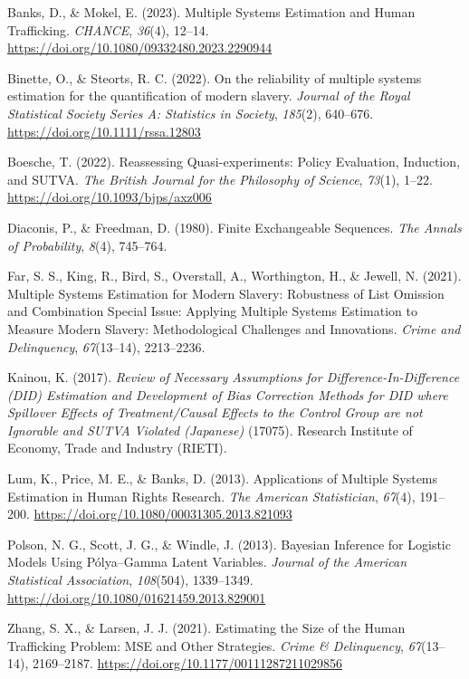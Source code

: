 \documentclass[
  12pt,
]{article}
\newlength{\cslhangindent}
\newenvironment{CSLReferences}[2] %
 {\begin{list}{}{%
  \setlength{\itemindent}{0pt}
  \setlength{\leftmargin}{0pt}
  \setlength{\parsep}{0pt}
  \ifodd #1
   \setlength{\leftmargin}{\cslhangindent}
   \setlength{\itemindent}{-1\cslhangindent}
  \fi
  \setlength{\itemsep}{#2\baselineskip}}}
 {\end{list}}
\theoremstyle{plain}
\theoremstyle{definition}
\begin{document}
\label{refs}
\begin{CSLReferences}{1}{0}
Banks, D., \& Mokel, E. (2023). Multiple {Systems Estimation} and {Human
Trafficking}. \emph{CHANCE}, \emph{36}(4), 12--14.
\url{https://doi.org/10.1080/09332480.2023.2290944}

Binette, O., \& Steorts, R. C. (2022). On the reliability of multiple
systems estimation for the quantification of modern slavery.
\emph{Journal of the Royal Statistical Society Series A: Statistics in
Society}, \emph{185}(2), 640--676.
\url{https://doi.org/10.1111/rssa.12803}

Boesche, T. (2022). Reassessing {Quasi-experiments}: {Policy
Evaluation}, {Induction}, and {SUTVA}. \emph{The British Journal for the
Philosophy of Science}, \emph{73}(1), 1--22.
\url{https://doi.org/10.1093/bjps/axz006}

Diaconis, P., \& Freedman, D. (1980). Finite {Exchangeable Sequences}.
\emph{The Annals of Probability}, \emph{8}(4), 745--764.

Far, S. S., King, R., Bird, S., Overstall, A., Worthington, H., \&
Jewell, N. (2021). Multiple {Systems Estimation} for {Modern Slavery}:
{Robustness} of {List Omission} and {Combination Special Issue}:
{Applying Multiple Systems Estimation} to {Measure Modern Slavery}:
{Methodological Challenges} and {Innovations}. \emph{Crime and
Delinquency}, \emph{67}(13--14), 2213--2236.

Kainou, K. (2017). \emph{Review of {Necessary Assumptions} for
{Difference-In-Difference} ({DID}) {Estimation} and {Development} of
{Bias Correction Methods} for {DID} where {Spillover Effects} of
{Treatment}/{Causal Effects} to the {Control Group} are not {Ignorable}
and {SUTVA Violated} ({Japanese})} (17075). {Research Institute of
Economy, Trade and Industry (RIETI).}

Lum, K., Price, M. E., \& Banks, D. (2013). Applications of {Multiple
Systems Estimation} in {Human Rights Research}. \emph{The American
Statistician}, \emph{67}(4), 191--200.
\url{https://doi.org/10.1080/00031305.2013.821093}

Polson, N. G., Scott, J. G., \& Windle, J. (2013). Bayesian {Inference}
for {Logistic Models Using Pólya}--{Gamma Latent Variables}.
\emph{Journal of the American Statistical Association}, \emph{108}(504),
1339--1349. \url{https://doi.org/10.1080/01621459.2013.829001}

Zhang, S. X., \& Larsen, J. J. (2021). Estimating the {Size} of the
{Human Trafficking Problem}: {MSE} and {Other Strategies}. \emph{Crime
\& Delinquency}, \emph{67}(13--14), 2169--2187.
\url{https://doi.org/10.1177/00111287211029856}

\end{CSLReferences}
\end{document}
